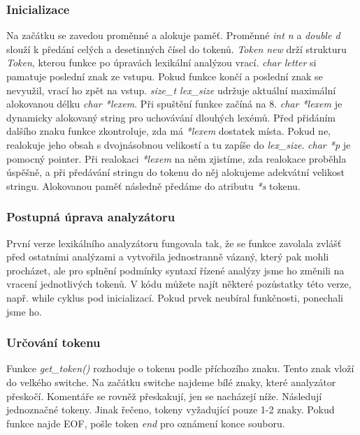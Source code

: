 \documentclass[a4paper, 12pt]{article}
\begin{document}
\subsubsection{Inicializace}
Na začátku se zavedou proměnné a alokuje paměť.\newline
Proměnné \textit{int n} a \textit{double d} slouží k předání celých a desetinných čísel do tokenů. \textit{Token new} drží strukturu \textit{Token}, kterou funkce po úpravách lexikální analýzou vrací. \textit{char letter} si pamatuje poslední znak ze vstupu. Pokud funkce končí a poslední znak se nevyužil, vrací ho zpět na vstup. \textit{size\_t lex\_size} udržuje aktuální maximální alokovanou délku \textit{char *lexem}. Při spuštění funkce začíná na 8. \textit{char *lexem} je dynamicky alokovaný string pro uchovávání dlouhých lexémů. Před přidáním dalšího znaku funkce zkontroluje, zda má \textit{*lexem} dostatek místa. Pokud ne, realokuje jeho obsah s dvojnásobnou velikostí a tu zapíše do \textit{lex\_size}. \textit{char *p} je pomocný pointer. Při realokaci \textit{*lexem} na něm zjistíme, zda realokace proběhla úspěšně, a při předávání stringu do tokenu do něj alokujeme adekvátní velikost stringu. Alokovanou paměť následně předáme do atributu \textit{*s} tokenu.

\subsubsection{Postupná úprava analyzátoru}
První verze lexikálního analyzátoru fungovala tak, že se funkce zavolala zvlášť před ostatními analýzami a vytvořila jednostranně vázaný, který pak mohli procházet, ale pro splnění podmínky syntaxí řízené analýzy jsme ho změnili na vracení jednotlivých tokenů. V kódu můžete najít některé pozůstatky této verze, např. while cyklus pod inicializací. Pokud prvek neubíral funkčnosti, ponechali jsme ho.

\subsubsection{Určování tokenu}
Funkce \textit{get\_token()} rozhoduje o tokenu podle příchozího znaku. Tento znak vloží do velkého switche.\newline
Na začátku switche najdeme bílé znaky, které analyzátor přeskočí. Komentáře se rovněž přeskakují, jen se nacházejí níže.\newline
Následují jednoznačné tokeny. Jinak řečeno, tokeny vyžadující pouze 1-2 znaky.\newline
\newline
\newline
\newline
\newline
Pokud funkce najde EOF, pošle token \textit{end} pro oznámení konce souboru.\newline
\end{document}

